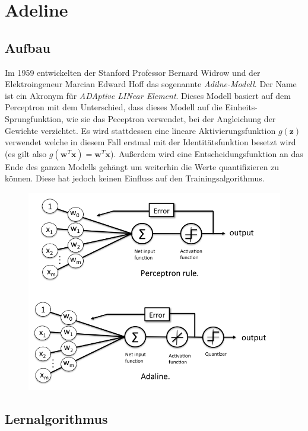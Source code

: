 \section{Adeline}

\subsection{Aufbau}

Im 1959 entwickelten der Stanford Professor Bernard Widrow und der Elektroingeneur Marcian Edward Hoff das sogenannte \emph{Adilne-Modell}. Der Name ist ein Akronym für \emph{ADAptive LINear Element}. Dieses Modell basiert auf dem Perceptron mit dem Unterschied, dass dieses Modell auf die Einheits-Sprungfunktion, wie sie das Peceptron verwendet, bei der Angleichung der Gewichte verzichtet. Es wird stattdessen eine lineare Aktivierungsfunktion ${g(\mathbf{z})}$ verwendet welche in diesem Fall erstmal mit der Identitätsfunktion besetzt wird (es gilt also ${g(\mathbf{w}^T\mathbf{x}) = \mathbf{w}^T\mathbf{x}}$). Außerdem wird eine Entscheidungsfunktion an das Ende des ganzen Modells gehängt um weiterhin die Werte quantifizieren zu können. Diese hat jedoch keinen Einfluss auf den Trainingsalgorithmus. 

\begin{figure}[!htb]
	\centering
	\includegraphics[width=.8\linewidth]{img/adeline_aufbau}
	\label{fig:ad_aufbau}
\end{figure}


\subsection{Lernalgorithmus}

